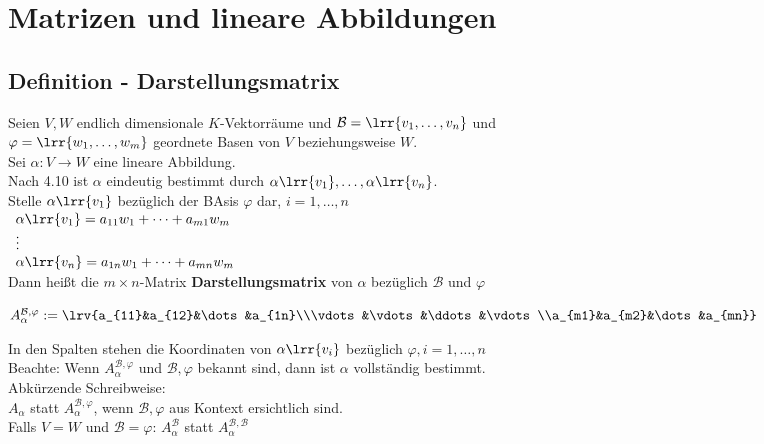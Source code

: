 \newpage
\section{Matrizen und lineare Abbildungen}
\subsection{Definition - Darstellungsmatrix}
	Seien $V,W$ endlich dimensionale $K$-Vektorräume und $\mathcal{B}=\lrr{v_1,\dots,v_n}$ und\\
	$\varphi=\lrr{w_1,\dots,w_m}$ geordnete Basen von $V$ beziehungsweise $W$.\\
	Sei $\alpha: V\rightarrow W$ eine lineare Abbildung.\\
	Nach 4.10 ist $\alpha$ eindeutig bestimmt durch $\alpha\lrr{v_1},\dots,\alpha\lrr{v_n}$.\\
	Stelle $\alpha\lrr{v_1}$ bezüglich der BAsis $\varphi$ dar, $i=1,\dots,n$\\
	$\begin{array}{l}
		\alpha\lrr{v_1}=a_{11}w_1+\dots+a_{m1}w_m\\
		\vdots\\
		\alpha\lrr{v_n}=a_{1n}w_1+\dots+a_{mn}w_m
	\end{array}$\\
	Dann heißt die $m\times n$-Matrix \textbf{Darstellungsmatrix} von $\alpha$ bezüglich $\mathcal{B}$ und $\varphi$
	
	$A_{\alpha}^{\mathcal{B}, \varphi}:=\lrv{a_{11}&a_{12}&\dots&a_{1n}\\\vdots&\vdots&\ddots&\vdots\\a_{m1}&a_{m2}&\dots&a_{mn}}$
	
	In den Spalten stehen die Koordinaten von $\alpha\lrr{v_i}$ bezüglich $\varphi, i=1,\dots,n$\\
	Beachte: Wenn $A_{\alpha}^{\mathcal{B}, \varphi}$ und $\mathcal{B},\varphi$ bekannt sind, dann ist $\alpha$ vollständig bestimmt.\\
	Abkürzende Schreibweise:\\
	$A_\alpha$ statt $A_{\alpha}^{\mathcal{B}, \varphi}$, wenn $\mathcal{B},\varphi$ aus Kontext ersichtlich sind.\\
	Falls $V=W$ und $\mathcal{B}=\varphi$: $A_{\alpha}^{\mathcal{B}}$ statt $A_{\alpha}^{\mathcal{B}, \mathcal{B}}$
	
